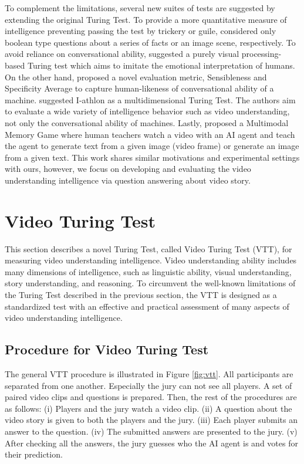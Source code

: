 \documentclass[letterpaper]{article} %
\begin{document}
To complement the limitations, several new suites of tests are suggested by extending the original Turing Test.
To provide a more quantitative measure of intelligence preventing passing the test by trickery or guile, \cite{mckinstry1997minimum,geman2015visual} considered only boolean type questions about a series of facts or an image scene, respectively.
To avoid reliance on conversational ability, \cite{olague2021less} suggested a purely visual processing-based Turing test which aims to imitate the emotional interpretation of humans. On the other hand, \cite{adiwardana2020meena} proposed a novel evaluation metric, Sensibleness and Specificity Average to capture human-likeness of conversational ability of a machine.
\cite{adams2016athlon} suggested I-athlon as a multidimensional Turing Test. The authors aim to evaluate a wide variety of intelligence behavior such as video understanding, not only the conversational ability of machines.
Lastly, \cite{zhang2009teaching} proposed a Multimodal Memory Game where human teachers watch a video with an AI agent and teach the agent to generate text from a given image (video frame) or generate an image from a given text. This work shares similar motivations and experimental settings with ours, however, we focus on developing and evaluating the video understanding intelligence via question answering about video story.

\section{Video Turing Test}\label{sec:vtt} %
This section describes a novel Turing Test, called Video Turing Test (VTT), for measuring video understanding intelligence. Video understanding ability includes many dimensions of intelligence, such as linguistic ability, visual understanding, story understanding, and reasoning. To circumvent the well-known limitations of the Turing Test described in the previous section, the VTT is designed as a standardized test with an effective and practical assessment of many aspects of video understanding intelligence.

\subsection{Procedure for Video Turing Test}
The general VTT procedure is illustrated in Figure \ref{fig:vtt}. All participants are separated from one another. Especially the jury can not see all players. A set of paired video clips and questions is prepared. Then, the rest of the procedures are as follows: (i) Players and the jury watch a video clip. (ii) A question about the video story is given to both the players and the jury. (iii) Each player submits an answer to the question. (iv) The submitted answers are presented to the jury. (v) After checking all the answers, the jury guesses who the AI agent is and votes for their prediction.
\end{document}
